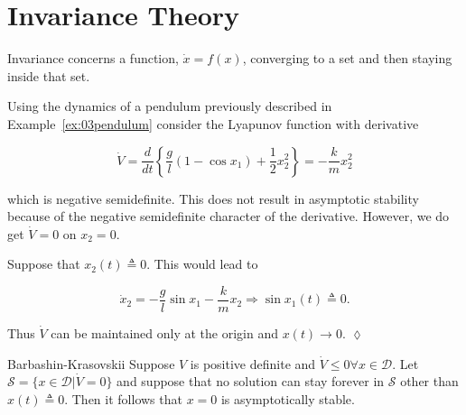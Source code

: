 \mainmatter%
\setcounter{page}{1}

\lectureseries[\course]{\course}

\date{February 9, 2010}

\setaddress%

\setcounter{lecture}{10}
\setcounter{chapter}{10}


\section{Invariance Theory}
Invariance concerns a function, $\dot{x}=f(x)$, converging to a set and then staying inside that set.

\begin{example}
Using the dynamics of a pendulum previously described in Example~\ref{ex:03pendulum} consider the Lyapunov function with derivative

\begin{equation*}
\dot{V} = \frac{d}{dt}\left\{\frac{g}{l}\left(1-\cos x_1\right) + \frac{1}{2}x_2^2\right\} = -\frac{k}{m}x_2^2
\end{equation*}

which is negative semidefinite.
This does not result in asymptotic stability because of the negative semidefinite character of the derivative.
However, we do get $\dot{V}=0$ on $x_2=0$.

Suppose that $x_2(t)\triangleq0$.
This would lead to

\begin{equation*}
\dot{x}_2 = -\frac{g}{l}\sin x_1 - \frac{k}{m}x_2 \Rightarrow \sin x_1(t) \triangleq 0.
\end{equation*}

Thus $\dot{V}$ can be maintained only at the origin and $x(t)\to0$.
$\lozenge$
\end{example}

\begin{theorem}{Barbashin-Krasovskii}
Suppose $V$ is positive definite and $\dot{V}\leq0 \forall x\in\mathcal{D}$.
Let $\mathcal{S}=\{x\in\mathcal{D} | \dot{V} = 0\}$ and suppose that no solution can stay forever in $\mathcal{S}$ other than $x(t)\triangleq0$.
Then it follows that $x=0$ is asymptotically stable.
\end{theorem}

